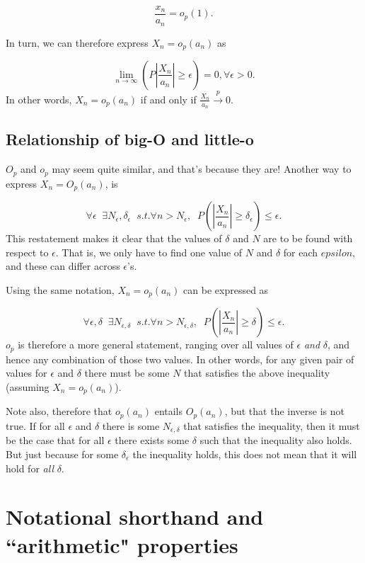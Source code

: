 \documentclass[
]{book}
\begin{document}
\[ \frac{x_n}{a_n} = o_p(1).\]

In turn, we can therefore express \(X_n = o_p(a_n)\) as

\[ \lim_{n\to\infty} (P|\frac{X_n}{a_n}| \geq \epsilon) = 0, \forall\epsilon > 0.\]
In other words, \(X_n = o_p(a_n)\) if and only if \(\frac{X_n}{a_n} \xrightarrow{p} 0\).

\hypertarget{relationship-of-big-o-and-little-o}{%
\subsection{Relationship of big-O and little-o}\label{relationship-of-big-o-and-little-o}}

\(O_p\) and \(o_p\) may seem quite similar, and that's because they are! Another way to express \(X_n = O_p(a_n)\), is

\[\forall \epsilon\;\; \exists N_\epsilon,\delta_\epsilon \;\; s.t. \forall n > N_\epsilon,\;\; P(|\frac{X_n}{a_n}| \geq \delta_\epsilon) \leq \epsilon.\]
This restatement makes it clear that the values of \(\delta\) and \(N\) are to be found with respect to \(\epsilon\). That is, we only have to find one value of \(N\) and \(\delta\) for each \(epsilon\), and these can differ across \(\epsilon\)'s.

Using the same notation, \(X_n = o_p(a_n)\) can be expressed as

\[\forall \epsilon,\delta\;\; \exists N_{\epsilon,\delta} \;\; s.t. \forall n > N_{\epsilon,\delta},\;\; P(|\frac{X_n}{a_n}| \geq \delta) \leq \epsilon.\]
\(o_p\) is therefore a more general statement, ranging over all values of \(\epsilon\) \emph{and} \(\delta\), and hence any combination of those two values. In other words, for any given pair of values for \(\epsilon\) and \(\delta\) there must be some \(N\) that satisfies the above inequality (assuming \(X_n = o_p(a_n)\)).

Note also, therefore that \(o_p(a_n)\) entails \(O_p(a_n)\), but that the inverse is not true. If for all \(\epsilon\) and \(\delta\) there is some \(N_{\epsilon,\delta}\) that satisfies the inequality, then it must be the case that for all \(\epsilon\) there exists some \(\delta\) such that the inequality also holds. But just because for some \(\delta_\epsilon\) the inequality holds, this does not mean that it will hold for \emph{all} \(\delta\).

\hypertarget{notational-shorthand-and-arithmetic-properties}{%
\section{Notational shorthand and ``arithmetic" properties}\label{notational-shorthand-and-arithmetic-properties}}
\end{document}
